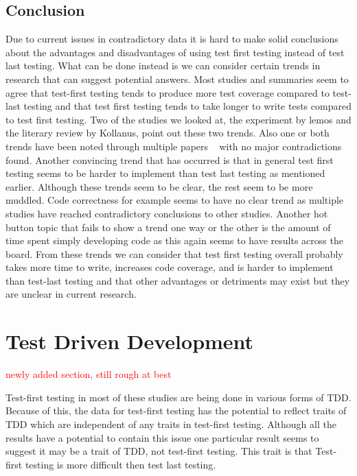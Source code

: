 \documentclass{sig-alternate}
\newcommand{\mycomment}[1]{\textcolor{red}{#1}}
\begin{document}
\subsection{Conclusion}

Due to current issues in contradictory data it is hard to make solid conclusions about the advantages and disadvantages of using test first testing instead of test last testing.  What can be done instead is we can consider certain trends in research that can suggest potential answers.  Most studies and summaries seem to agree that test-first testing tends to produce more test coverage compared to test-last testing and that test first testing tends to take longer to write tests compared to test first testing.  Two of the studies we looked at, the experiment by lemos and the literary review by Kollanus, point out these two trends.  Also one or both trends have been noted through multiple papers ~\cite{Kettunen:2010, Hammond:2012, Hellman:2012} with no major contradictions found.  Another convincing trend that has occurred is that in general test first testing seems to be harder to implement than test last testing as mentioned earlier.   Although these trends seem to be clear, the rest seem to be more muddled.  Code correctness for example seems to have no clear trend as multiple studies have reached contradictory conclusions to other studies.  Another hot button topic that fails to show a trend one way or the other is the amount of time spent simply developing code as this again seems to have results across the board.  From these trends we can consider that test first testing overall probably takes more time to write, increases code coverage, and is harder to implement than test-last testing and that other advantages or detriments may exist but they are unclear in current research.

\section{Test Driven Development}
\mycomment{newly added section, still rough at best}

Test-first testing in most of these studies are being done in various forms of TDD.  Because of this, the data for test-first testing has the potential to reflect traits of TDD which are independent of any traits in test-first testing.  Although all the results have a potential to contain this issue one particular result seems to suggest it may be a trait of TDD, not test-first testing.  This trait is that Test-first testing is more difficult then test last testing.  
\end{document}
